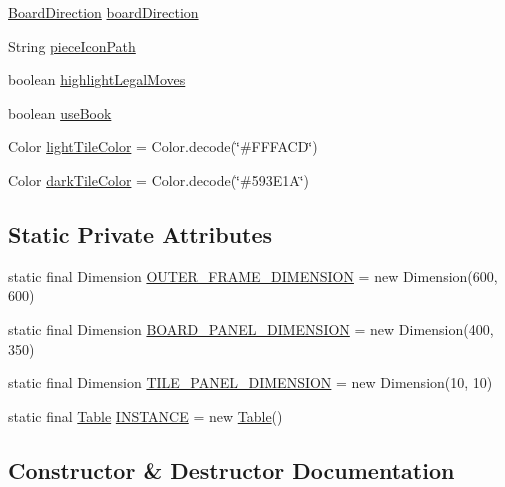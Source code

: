 \begin{DoxyCompactItemize}
\mbox{\hyperlink{enumcom_1_1chess_1_1gui_1_1_table_1_1_board_direction}{Board\+Direction}} \mbox{\hyperlink{classcom_1_1chess_1_1gui_1_1_table_ab2fb4b24fcf27c26ccdd47746d70cc39}{board\+Direction}}
\item 
String \mbox{\hyperlink{classcom_1_1chess_1_1gui_1_1_table_afef8537ff8d27040643b9d1ec337a321}{piece\+Icon\+Path}}
\item 
boolean \mbox{\hyperlink{classcom_1_1chess_1_1gui_1_1_table_ad6615658fdf814e3de3d64388e6a4270}{highlight\+Legal\+Moves}}
\item 
boolean \mbox{\hyperlink{classcom_1_1chess_1_1gui_1_1_table_a998f9455f6e0f38df428d6f3d5961859}{use\+Book}}
\item 
Color \mbox{\hyperlink{classcom_1_1chess_1_1gui_1_1_table_a63389706a3ef465594ccdd59c702446c}{light\+Tile\+Color}} = Color.\+decode(\char`\"{}\#F\+F\+F\+A\+CD\char`\"{})
\item 
Color \mbox{\hyperlink{classcom_1_1chess_1_1gui_1_1_table_a18a9f7349a069147d17da7b6c8f8dda2}{dark\+Tile\+Color}} = Color.\+decode(\char`\"{}\#593\+E1\+A\char`\"{})
\end{DoxyCompactItemize}
\subsection*{Static Private Attributes}
\begin{DoxyCompactItemize}
\item 
static final Dimension \mbox{\hyperlink{classcom_1_1chess_1_1gui_1_1_table_a03e617220bd3e0ee429b78a44532c044}{O\+U\+T\+E\+R\+\_\+\+F\+R\+A\+M\+E\+\_\+\+D\+I\+M\+E\+N\+S\+I\+ON}} = new Dimension(600, 600)
\item 
static final Dimension \mbox{\hyperlink{classcom_1_1chess_1_1gui_1_1_table_ab40cc71f57139c2d8780bb4988ebbb5b}{B\+O\+A\+R\+D\+\_\+\+P\+A\+N\+E\+L\+\_\+\+D\+I\+M\+E\+N\+S\+I\+ON}} = new Dimension(400, 350)
\item 
static final Dimension \mbox{\hyperlink{classcom_1_1chess_1_1gui_1_1_table_ac38b486cba37504671c17db0053d96ba}{T\+I\+L\+E\+\_\+\+P\+A\+N\+E\+L\+\_\+\+D\+I\+M\+E\+N\+S\+I\+ON}} = new Dimension(10, 10)
\item 
static final \mbox{\hyperlink{classcom_1_1chess_1_1gui_1_1_table}{Table}} \mbox{\hyperlink{classcom_1_1chess_1_1gui_1_1_table_ab11d2f0528e55d3c7817c5800f112b75}{I\+N\+S\+T\+A\+N\+CE}} = new \mbox{\hyperlink{classcom_1_1chess_1_1gui_1_1_table}{Table}}()
\end{DoxyCompactItemize}


\subsection{Constructor \& Destructor Documentation}
\mbox{\label{classcom_1_1chess_1_1gui_1_1_table_a3d374cfb954be2648c1081971d7e5965}} 
